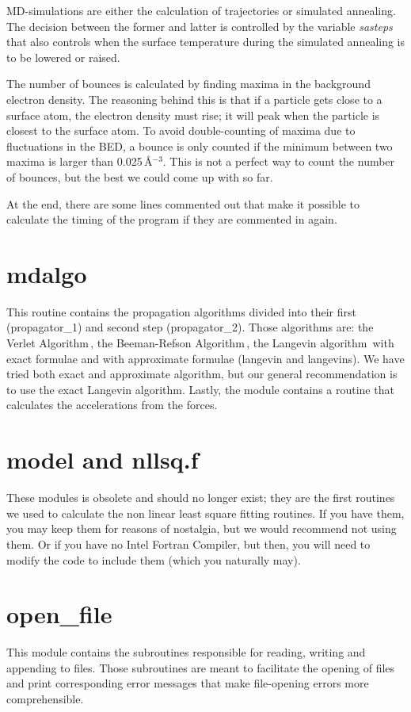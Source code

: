 \documentclass[twoside, 11pt, titlepage, captions=nooneline, a4paper, headsepline]{scrbook}%
\begin{document}
MD-simulations are either the calculation of trajectories or simulated annealing. The decision between the former and latter is controlled by the variable \textit{sasteps} that also controls when the surface temperature during the simulated annealing is to be lowered or raised.

The number of bounces is calculated by finding maxima in the background electron density. The reasoning behind this is that if a particle gets close to a surface atom, the electron density must rise; it will peak when the particle is closest to the surface atom. To avoid double-counting of maxima due to fluctuations in the BED, a bounce is only counted if the minimum between two maxima is larger than 0.025\,\AA$^{-3}$. This is not a perfect way to count the number of bounces, but the best we could come up with so far.

At the end, there are some lines commented out that make it possible to calculate the timing  of the program if they are commented in again.

\section{mdalgo}
This routine contains the propagation algorithms divided into their first (propagator\_1) and second step (propagator\_2). Those algorithms are: the Verlet Algorithm\,\cite{allen1989}, the Beeman-Refson Algorithm\,\cite{refson1985}, the Langevin algorithm\,\cite{allen1989} with exact formulae and with approximate formulae (langevin and langevins). We have tried both exact and approximate algorithm, but our general recommendation is to use the exact Langevin algorithm. Lastly, the module contains a routine that calculates the accelerations from the forces.

\section{model and nllsq.f}
These modules is obsolete and should no longer exist; they are the first routines we used to calculate the non linear least square fitting routines. If you have them, you may keep them for reasons of nostalgia, but we would recommend not using them. Or if you have no Intel Fortran Compiler, but then, you will need to modify the code to include them (which you naturally may).
\section{open\_file}
This module contains the subroutines responsible for reading, writing and appending to files. Those subroutines are meant to facilitate the opening of files and print corresponding error messages that make file-opening errors more comprehensible.
\end{document}

